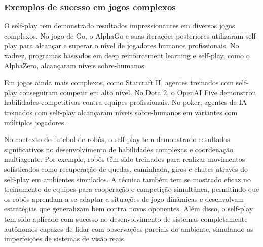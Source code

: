 \subsubsection{Exemplos de sucesso em jogos complexos}
\label{subsubsec:self_play_exemplos}

O self-play tem demonstrado resultados impressionantes em diversos jogos complexos. No jogo de Go, o AlphaGo e suas iterações posteriores utilizaram self-play para alcançar e superar o nível de jogadores humanos profissionais\cite{Sukhbaatar2018learninggoalembeddingsselfplay}. No xadrez, programas baseados em deep reinforcement learning e self-play, como o AlphaZero, alcançaram níveis sobre-humanos\cite{Sukhbaatar2018learninggoalembeddingsselfplay}.

Em jogos ainda mais complexos, como Starcraft II, agentes treinados com self-play conseguiram competir em alto nível\cite{Sukhbaatar2018learninggoalembeddingsselfplay}. No Dota 2, o OpenAI Five demonstrou habilidades competitivas contra equipes profissionais\cite{Sukhbaatar2018learninggoalembeddingsselfplay}. No poker, agentes de IA treinados com self-play alcançaram níveis sobre-humanos em variantes com múltiplos jogadores\cite{Sukhbaatar2018learninggoalembeddingsselfplay}.

No contexto do futebol de robôs, o self-play tem demonstrado resultados significativos no desenvolvimento de habilidades complexas e coordenação multiagente. Por exemplo, robôs têm sido treinados para realizar movimentos sofisticados como recuperação de quedas, caminhada, giros e chutes através do self-play em ambientes simulados\cite{Brando2022MultiagentRL}. A técnica também tem se mostrado eficaz no treinamento de equipes para cooperação e competição simultânea, permitindo que os robôs aprendam a se adaptar a situações de jogo dinâmicas e desenvolvam estratégias que generalizam bem contra novos oponentes\cite{Brando2022MultiagentRL}. Além disso, o self-play tem sido aplicado com sucesso no desenvolvimento de sistemas completamente autônomos capazes de lidar com observações parciais do ambiente, simulando as imperfeições de sistemas de visão reais\cite{Szemenyei2020LearningTP}.






